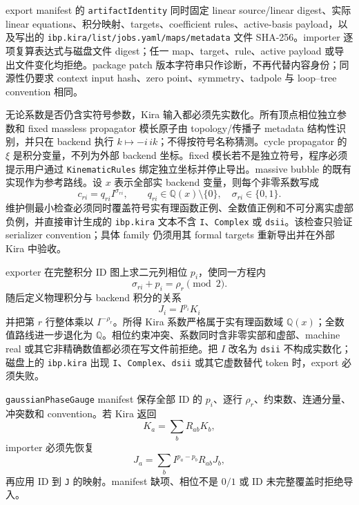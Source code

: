 ﻿\documentclass[a4paper,11pt]{article}
\begin{document}
export manifest 的 \texttt{artifactIdentity} 同时固定 linear source/linear digest、实际 linear equations、积分映射、targets、coefficient rules、active-basis payload，以及写出的 \texttt{ibp.kira/list/jobs.yaml/maps/metadata} 文件 SHA-256。importer 逐项复算表达式与磁盘文件 digest；任一 map、target、rule、active payload 或导出文件变化均拒绝。package patch 版本字符串只作诊断，不再代替内容身份；同源性仍要求 context input hash、zero point、symmetry、tadpole 与 loop--tree convention 相同。

无论系数是否仍含实符号参数，Kira 输入都必须先实数化。所有顶点相位独立参数和 fixed massless propagator 模长原子由 topology/传播子 metadata 结构性识别，并只在 backend 执行 $k\mapsto-i\,ik$；不得按符号名称猜测。cycle propagator 的 $\xi$ 是积分变量，不列为外部 backend 坐标。fixed 模长若不是独立符号，程序必须提示用户通过 \texttt{KinematicRules} 绑定独立坐标并停止导出。massive bubble 的既有实现作为参考路线。设 $x$ 表示全部实 backend 变量，则每个非零系数写成
\begin{equation}
  c_{ri}=q_{ri} I^{\sigma_{ri}},\qquad
  q_{ri}\in\mathbb{Q}(x)\setminus\{0\},\quad \sigma_{ri}\in\{0,1\}.
\end{equation}
维护侧最小检查必须同时覆盖符号实有理函数正例、全数值正例和不可分离实虚部负例，并直接审计生成的 \texttt{ibp.kira} 文本不含 \texttt{I}、\texttt{Complex} 或 \texttt{dsii}。该检查只验证 serializer convention；具体 family 仍须用其 formal targets 重新导出并在外部 Kira 中验收。

exporter 在完整积分 ID 图上求二元列相位 $p_i$，使同一方程内
\begin{equation}
  \sigma_{ri}+p_i=\rho_r\pmod 2.
\end{equation}
随后定义物理积分与 backend 积分的关系
\begin{equation}
  J_i=I^{p_i}K_i
\end{equation}
并把第 $r$ 行整体乘以 $I^{-\rho_r}$。所得 Kira 系数严格属于实有理函数域 $\mathbb{Q}(x)$；全数值路线进一步退化为 $\mathbb{Q}$。相位约束冲突、系数同时含非零实部和虚部、machine real 或其它非精确数值都必须在写文件前拒绝。把 $I$ 改名为 \texttt{dsii} 不构成实数化；磁盘上的 \texttt{ibp.kira} 出现 \texttt{I}、\texttt{Complex}、\texttt{dsii} 或其它虚数替代 token 时，export 必须失败。

\texttt{gaussianPhaseGauge} manifest 保存全部 ID 的 $p_i$、逐行 $\rho_r$、约束数、连通分量、冲突数和 convention。若 Kira 返回
\begin{equation}
  K_a=\sum_b R_{ab}K_b,
\end{equation}
importer 必须先恢复
\begin{equation}
  J_a=\sum_b I^{p_a-p_b}R_{ab}J_b,
\end{equation}
再应用 ID 到 \texttt{J} 的映射。manifest 缺项、相位不是 $0/1$ 或 ID 未完整覆盖时拒绝导入。
\end{document}
